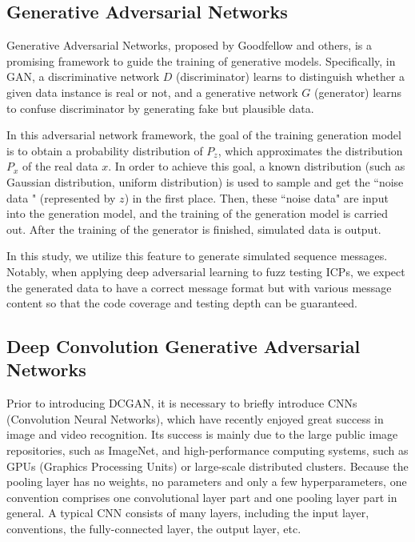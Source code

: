 \subsection{Generative Adversarial Networks}
Generative Adversarial Networks, proposed by Goodfellow and others, is a promising framework to guide the training of generative models. Specifically, in GAN, a discriminative network $D$ (discriminator) learns to distinguish whether a given data instance is real or not, and a generative network $G$ (generator) learns to confuse discriminator by generating fake but plausible data. 

In this adversarial network framework, the goal of the training generation model is to obtain a probability distribution of $P_z$, which approximates the distribution $P_x$ of the real data $x$. In order to achieve this goal, a known distribution (such as Gaussian distribution, uniform distribution) is used to sample and get the ``noise data " (represented by $z$) in the first place. Then, these ``noise data" are input into the generation model, and the training of the generation model is carried out. After the training of the generator is finished, simulated data is output. 

In this study, we utilize this feature to generate simulated sequence messages. Notably, when applying deep adversarial learning to fuzz testing ICPs, we expect the generated data to have a correct message format but with various message content so that the code coverage and testing depth can be guaranteed. 


\subsection{Deep Convolution Generative Adversarial Networks}
Prior to introducing DCGAN, it is necessary to briefly introduce CNNs (Convolution Neural Networks), which have recently enjoyed great success in image and video recognition. Its success is mainly due to the large public image repositories, such as ImageNet, and high-performance computing systems, such as GPUs (Graphics Processing Units) or large-scale distributed clusters. Because the pooling layer has no weights, no parameters and only a few hyperparameters, one convention comprises one convolutional layer part and one pooling layer part in general. A typical CNN consists of many layers, including the input layer, conventions, the fully-connected layer, the output layer, etc.

